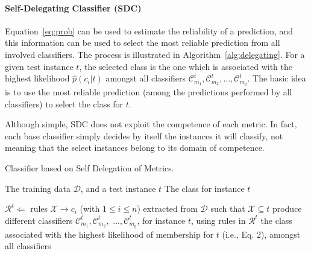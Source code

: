 \paragraph*{Self-Delegating Classifier (SDC)} Equation~\ref{eq:prob} can be used to estimate the reliability of a prediction, and this information can be used to select the most reliable prediction from all involved classifiers. The process is illustrated in Algorithm~\ref{alg:delegating}. For a given test instance $t$, the selected class is the one which is associated with the highest likelihood $\hat{p}(c_i|t)$ amongst all classifiers $\mathcal{C}^t_{m_1}, \mathcal{C}^t_{m_2},\ldots,\mathcal{C}^t_{m_q}$. The basic idea is to use the most reliable prediction (among the predictions performed by all classifiers) to select the class for $t$.

Although simple, SDC does not exploit the competence of each metric. In fact, each base classifier simply decides by itself the instances it will classify, not meaning that the select instances belong to its domain of competence.

\begin{algorithm} [ht!]
\caption{Classifier based on Self Delegation of Metrics.}
\begin{algorithmic}[1]
\REQUIRE The training data $\mathcal{D}$, and a test instance $t$
\ENSURE The class for instance $t$

\medskip

\STATE $\mathcal{R}^t\Leftarrow$ rules $\mathcal{X}\xrightarrow{}c_i$ (with $1\le i\le n$) extracted from $\mathcal{D}$ such that $\mathcal{X}\subseteq t$
\STATE produce different classifiers $\mathcal{C}^t_{m_1}, \mathcal{C}^t_{m_2},$ $\ldots, \mathcal{C}^t_{m_q}$, for instance $t$, using rules in $\mathcal{R}^t$
 the class associated with the highest likelihood of membership for $t$ (i.e., Eq. 2), amongst all classifiers

\end{algorithmic}
\label{alg:delegating}
\end{algorithm}

